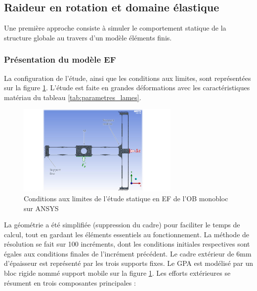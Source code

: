 	\subsection{Raideur en rotation et domaine élastique} 
Une première approche consiste à simuler le comportement statique de la structure globale au travers d'un modèle éléments finis. 
	 \subsubsection{Présentation du modèle EF} 
La configuration de l'étude, ainsi que les conditions aux limites, sont représentées sur la figure \ref{fig:ANSYS_Conditions_Initiales}. L'étude est faite en grandes déformations avec les caractéristiques matériau du tableau \ref{tab:parametres_lames}.\\
\begin{figure}[!htbp]
\begin{center}
    \captionsetup{justification=centering}
	\includegraphics[trim={4.5cm 0cm 6.5cm 0cm},clip, width=0.7\textwidth]{../Chap3/Figure/ANSYS_Conditions_Initiales.pdf}
	\caption{Conditions aux limites de l'étude statique en EF de l'OB monobloc sur ANSYS}
	\label{fig:ANSYS_Conditions_Initiales}
\end{center}
\end{figure}
La géométrie a été simplifiée (suppression du cadre) pour faciliter le temps de calcul, tout en gardant les éléments essentiels au fonctionnement. La méthode de résolution se fait sur 100 incréments, dont les conditions initiales respectives sont égales aux conditions finales de l'incrément précédent. Le cadre extérieur de 6mm d'épaisseur est représenté par les trois supports fixes. Le GPA est modélisé par un bloc rigide nommé support mobile sur la figure \ref{fig:ANSYS_Conditions_Initiales}. Les efforts extérieures se résument en trois composantes principales :
